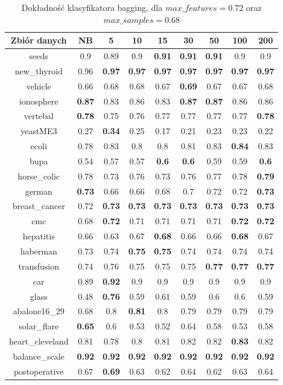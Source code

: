 \begin{table}[H]
\begin{center}
{\begin{tabular}{c|cccccccc}
				Zbiór danych&NB&5&10&15&30&50&100&200\\%
				\hline%
				seeds&0.9&0.89&0.9&\textbf{0.91}&\textbf{0.91}&\textbf{0.91}&0.9&0.9\\%
				new\_thyroid&0.96&\textbf{0.97}&\textbf{0.97}&\textbf{0.97}&\textbf{0.97}&\textbf{0.97}&\textbf{0.97}&\textbf{0.97}\\%
				vehicle&0.66&0.68&0.68&0.67&\textbf{0.69}&0.67&0.67&0.68\\%
				ionosphere&\textbf{0.87}&0.83&0.86&0.83&\textbf{0.87}&\textbf{0.87}&0.86&0.86\\%
				vertebal&\textbf{0.78}&0.75&0.76&0.77&0.77&0.77&0.77&\textbf{0.78}\\%
				yeastME3&0.27&\textbf{0.34}&0.25&0.17&0.21&0.23&0.23&0.22\\%
				ecoli&0.78&0.83&0.8&0.8&0.81&0.83&\textbf{0.84}&0.83\\%
				bupa&0.54&0.57&0.57&\textbf{0.6}&\textbf{0.6}&0.59&0.59&\textbf{0.6}\\%
				horse\_colic&0.78&0.73&0.76&0.73&0.76&0.77&0.78&\textbf{0.79}\\%
				german&\textbf{0.73}&0.66&0.66&0.68&0.7&0.72&0.72&\textbf{0.73}\\%
				breast\_cancer&0.72&\textbf{0.73}&\textbf{0.73}&\textbf{0.73}&\textbf{0.73}&\textbf{0.73}&\textbf{0.73}&\textbf{0.73}\\%
				cmc&0.68&\textbf{0.72}&0.71&0.71&0.71&0.71&\textbf{0.72}&\textbf{0.72}\\%
				hepatitis&0.66&0.63&0.67&\textbf{0.68}&0.66&0.66&\textbf{0.68}&0.67\\%
				haberman&0.73&0.74&\textbf{0.75}&\textbf{0.75}&0.74&0.74&0.74&0.74\\%
				transfusion&0.74&0.76&0.75&0.75&0.75&\textbf{0.77}&\textbf{0.77}&\textbf{0.77}\\%
				car&0.89&\textbf{0.92}&0.9&0.9&0.9&0.9&0.9&0.9\\%
				glass&0.48&\textbf{0.76}&0.59&0.61&0.59&0.6&0.6&0.59\\%
				abalone16\_29&0.68&0.8&\textbf{0.81}&0.8&0.79&0.79&0.79&0.79\\%
				solar\_flare&\textbf{0.65}&0.6&0.53&0.52&0.64&0.58&0.53&0.58\\%
				heart\_cleveland&0.81&0.78&0.8&0.81&0.82&0.82&\textbf{0.83}&0.82\\%
				balance\_scale&\textbf{0.92}&\textbf{0.92}&\textbf{0.92}&\textbf{0.92}&\textbf{0.92}&\textbf{0.92}&\textbf{0.92}&\textbf{0.92}\\%
				postoperative&0.67&\textbf{0.69}&0.63&0.62&0.64&0.62&0.63&0.64\\%
				\end{tabular}}
			\caption{Dokładność klasyfikatora bagging, dla $max\_features = 0.72$ oraz $max\_samples = 0.68$}
			\label{bagging_acc2}
		\end{center}
	\end{table}
